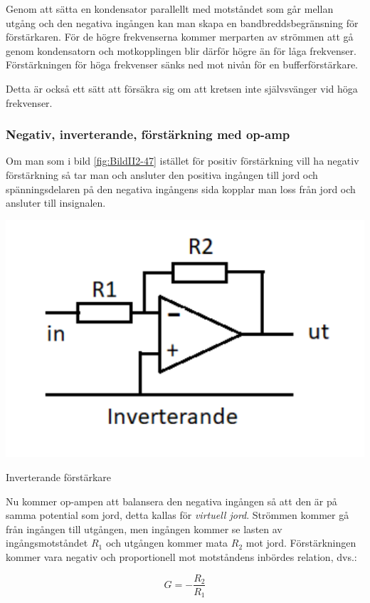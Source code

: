 Genom att sätta en kondensator parallellt med motståndet som går mellan utgång
och den negativa ingången kan man skapa en bandbreddsbegränsning för
förstärkaren.
För de högre frekvenserna kommer merparten av strömmen att gå genom
kondensatorn och motkopplingen blir därför högre än för låga frekvenser.
Förstärkningen för höga frekvenser sänks ned mot nivån för en bufferförstärkare.

Detta är också ett sätt att försäkra sig om att kretsen inte självsvänger vid
höga frekvenser.

\subsubsection{Negativ, inverterande, förstärkning med op-amp}
\label{inverterande förstärkning}
\label{virtuell jord}
\label{jordning!virtuell}

Om man som i bild \ref{fig:BildII2-47} istället för positiv förstärkning vill
ha negativ förstärkning så tar man och ansluter den positiva ingången till jord
och spänningsdelaren på den negativa ingångens sida kopplar man loss från jord
och ansluter till insignalen.

\begin{marginfigure}
	\includegraphics[width=\textwidth]{images/cropped_pdfs/bild_2_2-47.pdf}
	\caption{Inverterande förstärkare}
	\label{fig:BildII2-47}
\end{marginfigure}

Nu kommer op-ampen att balansera den negativa ingången så att den är på samma
potential som jord, detta kallas för \emph{virtuell jord}.
Strömmen kommer gå från ingången till utgången, men ingången kommer se lasten
av ingångsmotståndet \(R_1\) och utgången kommer mata \(R_2\) mot jord.
Förstärkningen kommer vara negativ och proportionell mot motståndens inbördes
relation, dvs.:

\[G = -\frac{R_2}{R_1}\]
